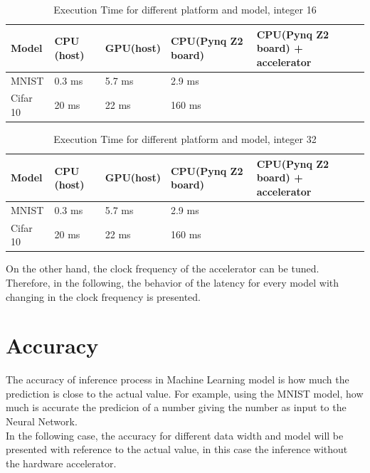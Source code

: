 \begin{center}
\begin{table}[!htbp]
\centering
\captionsetup{justification=centering}
\begin{tabular}{ |p{2.5cm}||p{2.5cm}|p{2.5cm}|p{2.5cm}|p{2.5cm}| }
\hline
Model & CPU (host)\protect\footnotemark[1] & GPU(host)\protect\footnotemark[2] & CPU(Pynq Z2 board)\protect\footnotemark[3] & CPU(Pynq Z2 board) + accelerator \\
\hline
MNIST & 0.3 ms & 5.7 ms & 2.9 ms  & \\
\hline
Cifar 10& 20 ms & 22 ms& 160 ms &\\
\hline
\end{tabular}
\caption{Execution Time for different platform and model, integer 16}
\label{table:moplatint16}
\end{table}
\end{center}
\begin{center}
\begin{table}[!htbp]
\centering
\captionsetup{justification=centering}
\begin{tabular}{ |p{2.5cm}||p{2.5cm}|p{2.5cm}|p{2.5cm}|p{2.5cm}| }
\hline
Model & CPU (host)\protect\footnotemark[1] & GPU(host)\protect\footnotemark[2] & CPU(Pynq Z2 board)\protect\footnotemark[3] & CPU(Pynq Z2 board) + accelerator \\
\hline
MNIST & 0.3 ms & 5.7 ms & 2.9 ms  & \\
\hline
Cifar 10& 20 ms & 22 ms& 160 ms &\\
\hline
\end{tabular}
\caption{Execution Time for different platform and model, integer 32}
\label{table:moplatint32}
\end{table}
\end{center}



On the other hand, the clock frequency of the accelerator can be tuned. Therefore, in the following, the behavior of the latency for every model with changing in the clock frequency is presented.

\newpage

\section{Accuracy}
The accuracy of inference process in Machine Learning model is how much the prediction is close to the actual value. For example, using the MNIST model, how much is accurate the predicion of a number giving the number as input to the Neural Network. \\ 
In the following case, the accuracy for different data width and model will be presented with reference to the actual value, in this case the inference without the hardware accelerator.

